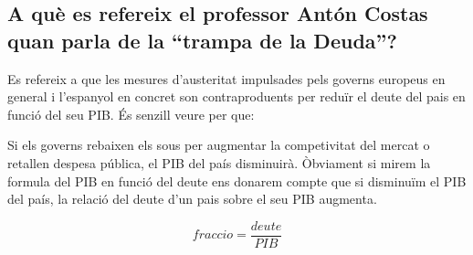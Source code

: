 \subsection{A què es refereix el professor Antón Costas quan parla de la 
``trampa de la Deuda''?}

Es refereix a que les mesures d'austeritat impulsades pels governs europeus 
en general i l'espanyol en concret son contraproduents per reduïr el deute
del pais en funció del seu PIB. És senzill veure per que:

Si els governs rebaixen els sous per augmentar la competivitat del mercat
o retallen despesa pública, el PIB del país disminuirà. Òbviament si mirem
la formula del PIB en funció del deute ens donarem compte que si disminuïm
el PIB del país, la relació del deute d'un pais sobre el seu PIB augmenta.

\[ fraccio = \frac{deute}{PIB} \]
